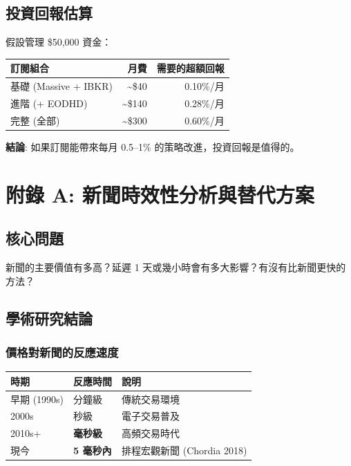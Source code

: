 \documentclass[11pt,a4paper]{article}
\begin{document}
\subsection{投資回報估算}

假設管理 \$50,000 資金：

\begin{table}[H]
\centering
\begin{tabular}{@{}lrr@{}}
\toprule
\textbf{訂閱組合} & \textbf{月費} & \textbf{需要的超額回報} \\
\midrule
基礎 (Massive + IBKR) & \textasciitilde\$40 & 0.10\%/月 \\
進階 (+ EODHD) & \textasciitilde\$140 & 0.28\%/月 \\
完整 (全部) & \textasciitilde\$300 & 0.60\%/月 \\
\bottomrule
\end{tabular}
\end{table}

\textbf{結論}: 如果訂閱能帶來每月 0.5--1\% 的策略改進，投資回報是值得的。

\newpage
\section*{附錄 A: 新聞時效性分析與替代方案}

\subsection*{核心問題}

新聞的主要價值有多高？延遲 1 天或幾小時會有多大影響？有沒有比新聞更快的方法？

\subsection*{學術研究結論}

\subsubsection*{價格對新聞的反應速度}

\begin{table}[H]
\centering
\begin{tabular}{@{}lll@{}}
\toprule
\textbf{時期} & \textbf{反應時間} & \textbf{說明} \\
\midrule
早期 (1990s) & 分鐘級 & 傳統交易環境 \\
2000s & 秒級 & 電子交易普及 \\
2010s+ & \textbf{毫秒級} & 高頻交易時代 \\
現今 & \textbf{5 毫秒內} & 排程宏觀新聞 (Chordia 2018) \\
\bottomrule
\end{tabular}
\end{table}
\end{document}
